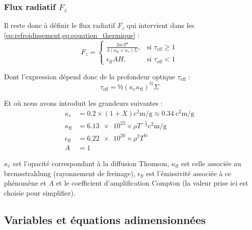 \subsubsection{\texorpdfstring{Flux radiatif $F_z$}{Flux radiatif Fz}}

Il reste donc à définir le flux radiatif $F_z$ qui intervient dans les
\cref{eq:refroidissement,eq:equation_thermique} :
\begin{equation}
    \label{eq:flux}
    F_z =
    \begin{cases}
        \frac{\num{2} a c T^{\num{4}}}{\num{3} (\kappa_\mathrm{ff} + \kappa_e)\Sigma}, &\text{si $\tau_\mathrm{eff} \geq \num{1}$} \\
        \epsilon_\mathrm{ff} A H, &\text{si $\tau_\mathrm{eff} < \num{1}$}
    \end{cases}
\end{equation}

Dont l’expression dépend donc de la profondeur optique $\tau_\mathrm{eff}$ :
\begin{equation}
    \label{eq:tau_eff}
    \tau_\mathrm{eff} = ½ (\kappa_e \kappa_\mathrm{ff})^½ \Sigma
\end{equation}

Et où nous avons introduit les grandeurs suivantes :
\begin{align}
    \label{eq:opacite_thomson}
    \kappa_e &= \num{0.2} \times (1+X) \si{\square\centi\meter\per\gram} \approx \SI{0.34}{\square\centi\meter\per\gram} \\
    \label{eq:opacite_bremsstrahlung}
    \kappa_\mathrm{ff} &= \num{6.13e22} \times \rho T^{-\frac{\num{7}}{\num{2}}} \si{\square\centi\meter\per\gram}\\
    \label{eq:emissivite}
    \epsilon_\mathrm{ff} &= \num{6.22e20} \times \rho^{\num{2}} T^½ \\
    A &= \num{1}
\end{align}

$\kappa_e$ est l’opacité correspondant à la diffusion Thomson,
$\kappa_\mathrm{ff}$ est celle associée au bremsstrahlung (rayonnement de
freinage), $\epsilon_\mathrm{ff}$ est l’émissivité associée à ce phénomène et
$A$ et le coefficient d’amplification Compton (la valeur prise ici est choisie
pour simplifier).

\subsection{Variables et équations adimensionnées}


